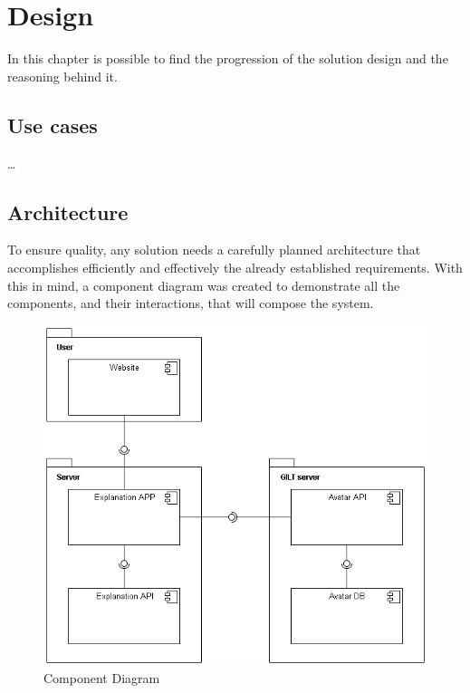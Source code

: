 
\chapter{Design} %
\label{chap:Chapter4}

In this chapter is possible to find the progression of the solution design and the reasoning behind it.

\section{Use cases}

\dots %

\section{Architecture}

To ensure quality, any solution needs a carefully planned architecture that accomplishes efficiently and effectively the already established requirements.
With this in mind, a component diagram was created to demonstrate all the components, and their interactions, that will compose the system.

\begin{figure}[H]
\centering
\includegraphics[scale=0.5]{ch4/assets/component_diagram.png}
\caption[Component Diagram]{Component Diagram}
\label{fig:cd}
\end{figure}

